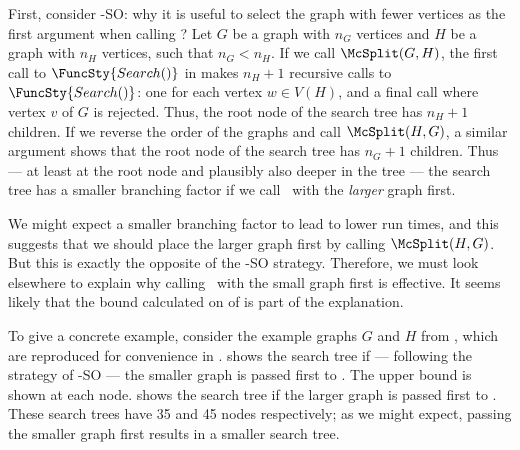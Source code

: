 First, consider \McSplit-SO: why it is useful to select the graph with
fewer vertices as the first argument when calling \McSplit?  Let $G$ be a graph
with $n_G$ vertices and $H$ be a graph with $n_H$ vertices, such that $n_G <
n_H$.  If we call $\McSplit(G,H)$, the first call to $\FuncSty{Search()}$ in
 makes $n_H + 1$ recursive calls to $\FuncSty{Search()}$: one
for each vertex $w \in V(H)$, and a final call where vertex $v$ of $G$ is
rejected.  Thus, the root node of the search tree has $n_H + 1$ children. If we
reverse the order of the graphs and call $\McSplit(H,G)$, a similar argument
shows that the root node of the search tree has $n_G + 1$ children.  Thus ---
at least at the root node and plausibly also deeper in the tree --- the search
tree has a smaller branching factor if we call \McSplit\ with the \emph{larger}
graph first.

We might expect a smaller branching factor to lead to lower run times, and this
suggests that we should place the larger graph first by calling $\McSplit(H,G)$.
But this is exactly the opposite of the \McSplit-SO strategy.
Therefore, we must look elsewhere to explain why calling \McSplit\ with the small
graph first is effective.  It seems likely that the bound calculated on 
of  is part of the explanation.

To give a concrete example, consider the example graphs $G$ and $H$ from
, which are reproduced for convenience in .
 shows the search tree if --- following the
strategy of \McSplit-SO --- the smaller graph is passed first to \McSplit.
The upper bound is shown at each node.
 shows the search tree if the larger graph
is passed first to \McSplit.  These search trees have 35 and 45 nodes respectively;
as we might expect, passing the smaller graph first results in a smaller search tree.


